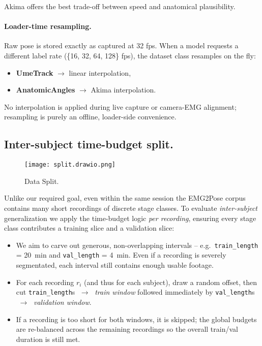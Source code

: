Akima offers the best trade-off between speed and anatomical plausibility.

\paragraph{Loader-time resampling.}
Raw pose is stored exactly as captured at 32 fps.
When a model requests a different label rate (\{16, 32, 64, 128\} fps),
the dataset class resamples on the fly:

\begin{itemize}
  \item \textbf{UmeTrack} $\to$ linear interpolation,
  \item \textbf{AnatomicAngles} $\to$ Akima interpolation.
\end{itemize}

No interpolation is applied during live capture or camera-EMG alignment;
resampling is purely an offline, loader-side convenience.

\subsection{Inter-subject time-budget split.}

\begin{figure}[H]
    \centering
    \texttt{[image: split.drawio.png]}
    \caption{Data Split.}
    \label{fig:split}
\end{figure}

Unlike our required goal, even within the same session the EMG2Pose corpus contains many short recordings of discrete stage classes.
To evaluate \emph{inter-subject} generalization we apply the time-budget logic \emph{per recording}, ensuring every stage class contributes a training slice and a validation slice:

\begin{itemize}
  \item We aim to carve out generous, non-overlapping intervals -- 
        e.g.\ \texttt{train\_length} = \SI{20}{min} and
        \texttt{val\_length} = \SI{4}{min}.
        Even if a recording is severely segmentated, each interval still contains enough usable footage.

  \item For each recording $r_{i}$ (and thus for each subject), draw  
        a random offset, then cut
        \texttt{train\_length}s $\;\to\;$ \emph{train window}
        followed immediately by
        \texttt{val\_length}s $\;\to\;$ \emph{validation window}.

  \item If a recording is too short for both windows, it is skipped; the global
        budgets are re-balanced across the remaining recordings so the overall
        train/val duration is still met.
\end{itemize}

